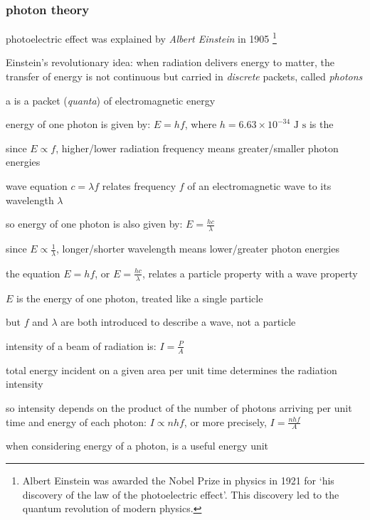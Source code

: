 \subsubsection{photon theory} \label{ch-photon-theory}

photoelectric effect was explained by \emph{Albert Einstein} in 1905
\footnote{Albert Einstein was awarded the Nobel Prize in physics in 1921 for `his discovery of the law of the photoelectric effect'. This discovery led to the quantum revolution of modern physics.}

Einstein's revolutionary idea: when radiation delivers energy to matter, the transfer of energy is not continuous but carried in \emph{discrete} packets, called \emph{photons}

\begin{ilight}
	a  is a packet (\emph{quanta}) of electromagnetic energy
\end{ilight}

\cmt energy of one photon is given by: $\boxed{E=hf}$, where $h=6.63\times10^{-34} \text{ J s}$ is the 

since $E \propto f$, higher/lower radiation frequency means greater/smaller photon energies

\cmt wave equation $c=\lambda f$ relates frequency $f$ of an electromagnetic wave to its wavelength $\lambda$

so energy of one photon is also given by: $\boxed{E=\frac{hc}{\lambda}}$

since $E \propto \frac{1}{\lambda}$, longer/shorter wavelength means lower/greater photon energies

\cmt the equation $E=hf$, or $E=\frac{hc}{\lambda}$,  relates a particle property with a wave property

$E$ is the energy of one photon, treated like a single particle

but $f$ and $\lambda$ are both introduced to describe a wave, not a particle

\cmt intensity of a beam of radiation is: $I = \frac{P}{A}$

total energy incident on a given area per unit time determines the radiation intensity

so intensity depends on the product of the number of photons arriving per unit time and energy of each photon: $ \boxed{I \propto nhf}$, or more precisely, $I = \frac{nhf}{A}$

\cmt when considering energy of a photon,  is a useful energy unit

